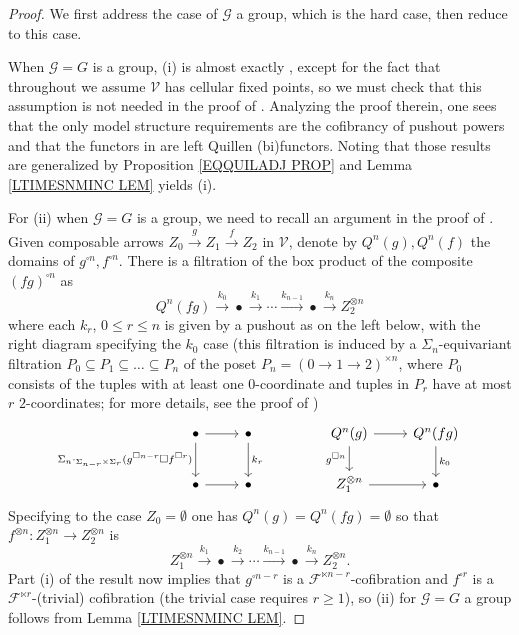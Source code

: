 \documentclass[a4paper,10pt
,draft
]{article}%
\numberwithin{equation}{section}
\numberwithin{figure}{section}
\theoremstyle{definition} %
\newcommand{\F}{\ensuremath{\mathcal F}}
\newcommand{\V}{\ensuremath{\mathcal V}}
\newcommand{\G}{\ensuremath{\mathcal G}}
\newcommand{\1}{\ensuremath{\mathbbm 1}}%
\begin{document}
\begin{proof}
We first address the case of $\G$ a group, 
which is the hard case, then reduce to this case.

When $\G = G$ is a group, 
(i) is almost exactly \cite[Prop. 6.24]{BP_geo}, 
except for the fact that throughout \cite{BP_geo}
we assume $\V$ has cellular fixed points, 
so we must check that this assumption is not needed in the proof of 
\cite[Prop. 6.24]{BP_geo}.
Analyzing the proof therein, one sees that the only model structure requirements are the cofibrancy of pushout powers
and that the functors in 
\cite[Props 6.5 and 6.22]{BP_geo}
are left Quillen (bi)functors.
Noting that those results are generalized by Proposition \ref{EQQUILADJ PROP} and Lemma \ref{LTIMESNMINC LEM} yields (i).


For (ii) when $\G=G$ is a group, we need to recall an argument 
in the proof of \cite[Prop. 6.24]{BP_geo}. 
%
Given composable arrows $Z_0 \xrightarrow{g} Z_1 \xrightarrow{f} Z_2$ in $\V$,
denote by $Q^n(g), Q^n(f)$ the domains of $g^{\square n}, f^{\square n}$.
There is a filtration of the box product of the composite
$(fg)^{\square n}$ as
\[
	Q^n(fg)
\xrightarrow{k_0}
	\bullet
\xrightarrow{k_1}
	\cdots
\xrightarrow{k_{n-1}}
	\bullet
\xrightarrow{k_{n}}
	Z_2^{\otimes n}
\] 
where each $k_r$, $0\leq r \leq n$ is given by a pushout as on the left below, with the right diagram specifying the $k_0$ case
(this filtration is induced by a $\Sigma_n$-equivariant filtration 
$P_0 \subseteq P_1 \subseteq \dots \subseteq P_n$ of the poset $P_n = (0 \to 1 \to 2)^{\times n}$,
where $P_0$ consists of the tuples with at least one $0$-coordinate 
and tuples in $P_r$ have at most $r$ $2$-coordinates;
for more details, see the proof of \cite[Lemma 4.8]{Pe16})
\begin{equation}\label{HGBOX_EQ}
	\begin{tikzcd}
		\bullet 
		\arrow[d, "\Sigma_n \cdot_{\Sigma_{n-r} \times \Sigma_r} (g^{\square n-r} \square f^{\square r})"'] \arrow[r]
	&
		\bullet \arrow[d, "k_r"]
	& &%
		Q^n(g) \arrow[r] \arrow[d, "g^{\square n}"']
	&
		Q^n(fg) \arrow[d, "k_0"]
\\
		\bullet \arrow[r]
	&
		\bullet
	& &%
		Z_1^{\otimes n} \arrow[r]
	&
		\bullet
	\end{tikzcd}
\end{equation}
Specifying to the case $Z_0 = \emptyset$ one has
$Q^n(g)= Q^n(fg) = \emptyset$
so that $f^{\otimes n} \colon Z_1^{\otimes n} \to Z_2^{\otimes n}$
is
\[
	Z_1^{\otimes n}
\xrightarrow{k_1}
	\bullet
\xrightarrow{k_2}
	\cdots
\xrightarrow{k_{n-1}}
	\bullet
\xrightarrow{k_{n}}
	Z_2^{\otimes n}.
\] 
Part (i) of the result now implies that 
$g^{\square n-r}$
is a $\F^{\ltimes n-r}$-cofibration
and
$f^{\square r}$
is a $\F^{\ltimes r}$-(trivial) cofibration
(the trivial case requires $r\geq 1$),
so (ii) for $\G=G$ a group follows from 
Lemma \ref{LTIMESNMINC LEM}.



\end{proof}
\end{document}
